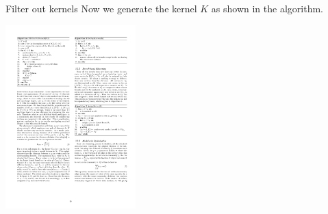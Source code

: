 


\begin{frame}{Filter out kernels}
\vskip 0.5cm
Now we generate the kernel $K$ as shown in the algorithm.
\begin{center}
	\includegraphics[height=7.1cm]{images/filterOutKernels.pdf}
\end{center}

\end{frame}






